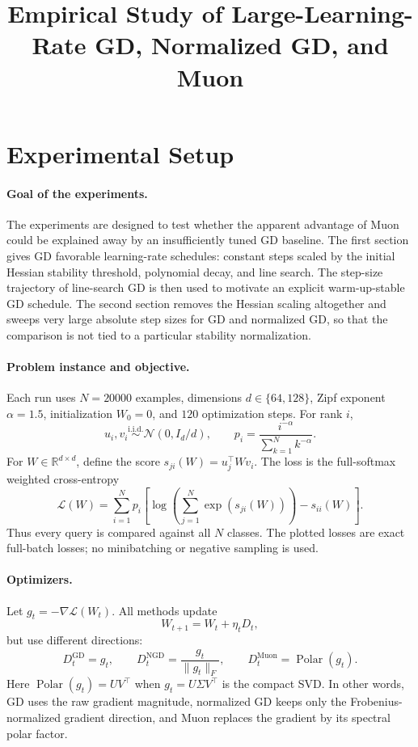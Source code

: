 \documentclass[11pt]{article}
\title{Empirical Study of Large-Learning-Rate GD, Normalized GD, and Muon}
\author{}
\date{}
\newcommand{\loss}{\mathcal{L}}
\newcommand{\R}{\mathbb{R}}
\begin{document}
\maketitle

\section{Experimental Setup}

\paragraph{Goal of the experiments.}
The experiments are designed to test whether the apparent advantage of Muon
could be explained away by an insufficiently tuned GD baseline.  The first
section gives GD favorable learning-rate schedules: constant steps scaled by
the initial Hessian stability threshold, polynomial decay, and line search.
The step-size trajectory of line-search GD is then used to motivate an
explicit warm-up-stable GD schedule.  The second section removes the Hessian
scaling altogether and sweeps very large absolute step sizes for GD and
normalized GD, so that the comparison is not tied to a particular stability
normalization.

\paragraph{Problem instance and objective.}
Each run uses $N=20000$ examples, dimensions $d\in\{64,128\}$, Zipf exponent
$\alpha=1.5$, initialization $W_0=0$, and $120$ optimization steps.  For
rank $i$,
\[
    u_i,v_i \overset{\mathrm{i.i.d.}}{\sim} \mathcal{N}(0,I_d/d),
    \qquad
    p_i=\frac{i^{-\alpha}}{\sum_{k=1}^N k^{-\alpha}}.
\]
For $W\in\R^{d\times d}$, define the score
$s_{ji}(W)=u_j^\top Wv_i$.  The loss is the full-softmax weighted
cross-entropy
\[
    \loss(W)
    =
    \sum_{i=1}^N p_i
    \left[
        \log\left(\sum_{j=1}^N \exp(s_{ji}(W))\right)
        -
        s_{ii}(W)
    \right].
\]
Thus every query is compared against all $N$ classes.  The plotted losses are
exact full-batch losses; no minibatching or negative sampling is used.

\paragraph{Optimizers.}
Let $g_t=-\nabla\loss(W_t)$.  All methods update
\[
    W_{t+1}=W_t+\eta_tD_t,
\]
but use different directions:
\[
    D_t^{\mathrm{GD}}=g_t,
    \qquad
    D_t^{\mathrm{NGD}}=\frac{g_t}{\|g_t\|_F},
    \qquad
    D_t^{\mathrm{Muon}}=\operatorname{Polar}(g_t).
\]
Here $\operatorname{Polar}(g_t)=UV^\top$ when
$g_t=U\Sigma V^\top$ is the compact SVD.  In other words, GD uses the raw
gradient magnitude, normalized GD keeps only the Frobenius-normalized gradient
direction, and Muon replaces the gradient by its spectral polar factor.
\end{document}

